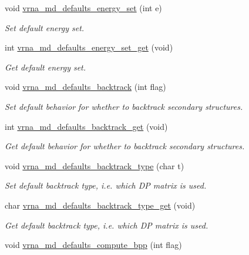\begin{DoxyCompactItemize}
void \mbox{\hyperlink{group__model__details_ga8dd29c55787a4576277e1907e92d810c}{vrna\+\_\+md\+\_\+defaults\+\_\+energy\+\_\+set}} (int e)
\begin{DoxyCompactList}\small\item\em Set default energy set. \end{DoxyCompactList}\item 
int \mbox{\hyperlink{group__model__details_ga017ed6afb1cba2b7f242412cab618b53}{vrna\+\_\+md\+\_\+defaults\+\_\+energy\+\_\+set\+\_\+get}} (void)
\begin{DoxyCompactList}\small\item\em Get default energy set. \end{DoxyCompactList}\item 
void \mbox{\hyperlink{group__model__details_ga978c468b2fe96a70d5191e3dd17d5599}{vrna\+\_\+md\+\_\+defaults\+\_\+backtrack}} (int flag)
\begin{DoxyCompactList}\small\item\em Set default behavior for whether to backtrack secondary structures. \end{DoxyCompactList}\item 
int \mbox{\hyperlink{group__model__details_ga90da1156e6883ddd68527c2830706648}{vrna\+\_\+md\+\_\+defaults\+\_\+backtrack\+\_\+get}} (void)
\begin{DoxyCompactList}\small\item\em Get default behavior for whether to backtrack secondary structures. \end{DoxyCompactList}\item 
void \mbox{\hyperlink{group__model__details_ga68305274de96b56b7799575e222560d8}{vrna\+\_\+md\+\_\+defaults\+\_\+backtrack\+\_\+type}} (char t)
\begin{DoxyCompactList}\small\item\em Set default backtrack type, i.\+e. which DP matrix is used. \end{DoxyCompactList}\item 
char \mbox{\hyperlink{group__model__details_ga1425b4ebd0e034dead66d79becd64143}{vrna\+\_\+md\+\_\+defaults\+\_\+backtrack\+\_\+type\+\_\+get}} (void)
\begin{DoxyCompactList}\small\item\em Get default backtrack type, i.\+e. which DP matrix is used. \end{DoxyCompactList}\item 
void \mbox{\hyperlink{group__model__details_gaf1b5db10f1f476767f9a95f8a78e3132}{vrna\+\_\+md\+\_\+defaults\+\_\+compute\+\_\+bpp}} (int flag)

\end{DoxyCompactItemize}
